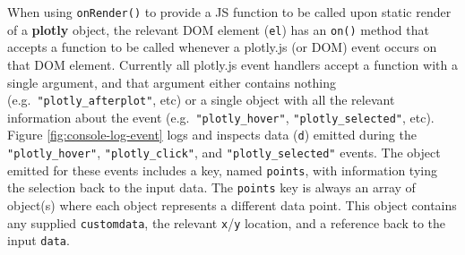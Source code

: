 \documentclass[
  12pt,
]{krantz}
\newenvironment{Shaded}{\begin{snugshade}}{\end{snugshade}}
\newcommand{\DataTypeTok}[1]{\textcolor[rgb]{0.13,0.29,0.53}{#1}}
\newcommand{\KeywordTok}[1]{\textcolor[rgb]{0.13,0.29,0.53}{\textbf{#1}}}
\newcommand{\NormalTok}[1]{#1}
\newcommand{\OperatorTok}[1]{\textcolor[rgb]{0.81,0.36,0.00}{\textbf{#1}}}
\newcommand{\StringTok}[1]{\textcolor[rgb]{0.31,0.60,0.02}{#1}}
\begin{document}
When using \texttt{onRender()} to provide a JS function to be called upon static render of a \textbf{plotly} object, the relevant DOM element (\texttt{el}) has an \texttt{on()} method that accepts a function to be called whenever a plotly.js (or DOM) event occurs on that DOM element. Currently all plotly.js event handlers accept a function with a single argument, and that argument either contains nothing (e.g.~\texttt{"plotly\_afterplot"}, etc) or a single object with all the relevant information about the event (e.g.~\texttt{"plotly\_hover"}, \texttt{"plotly\_selected"}, etc). Figure \ref{fig:console-log-event} logs and inspects data (\texttt{d}) emitted during the \texttt{"plotly\_hover"}, \texttt{"plotly\_click"}, and \texttt{"plotly\_selected"} events. The object emitted for these events includes a key, named \texttt{points}, with information tying the selection back to the input data. The \texttt{points} key is always an array of object(s) where each object represents a different data point. This object contains any supplied \texttt{customdata}, the relevant \texttt{x}/\texttt{y} location, and a reference back to the input \texttt{data}.

\begin{Shaded}
\end{Shaded}
\end{document}
